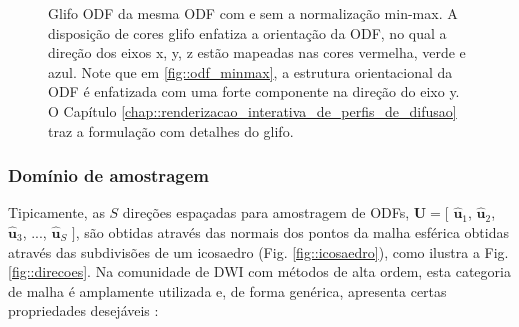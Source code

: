 \documentclass[
    12pt,                %
    oneside,            %
    a4paper,            %
    english,            %
    french,                %
    spanish,            %
    brazil                %
    ]{abntex2}
\begin{document}
\begin{figure}[ht]
\centering
\captionsetup[subfloat]{farskip=0pt,nearskip=0pt}
\centering
    \hspace{1em}
     \caption{Glifo ODF da mesma ODF com e sem a normalização min-max. A disposição de cores glifo enfatiza a orientação da ODF, no qual a direção dos eixos x, y, z estão mapeadas nas cores vermelha, verde e azul. Note que em \ref{fig::odf_minmax}, a estrutura orientacional da ODF é enfatizada com uma forte componente na direção do eixo y. O Capítulo \ref{chap::renderizacao_interativa_de_perfis_de_difusao} traz a formulação com detalhes do glifo.}
    \label{fig::normalizacao_min_max}
\end{figure}

\subsubsection{Domínio de amostragem}
\label{ssec::dominio_esferico}

Tipicamente, as $S$ direções espaçadas para amostragem de ODFs,
$\mathbf{U} = [$
$\mathbf{\hat{u}}_1$, 
$\mathbf{\hat{u}}_2$, 
$\mathbf{\hat{u}}_3$, ..., 
$\mathbf{\hat{u}}_S$ 
$]$, são obtidas através das normais dos pontos da malha esférica obtidas através das subdivisões de um icosaedro (Fig. \ref{fig::icosaedro}), como ilustra a Fig. \ref{fig::direcoes}. Na comunidade de DWI com métodos de alta ordem, esta categoria de malha é amplamente utilizada \cite{yeh2010, TuchQBall2004, descoteaux2007} e, de forma genérica, apresenta certas propriedades desejáveis  \cite{popko2012}:
\end{document}
